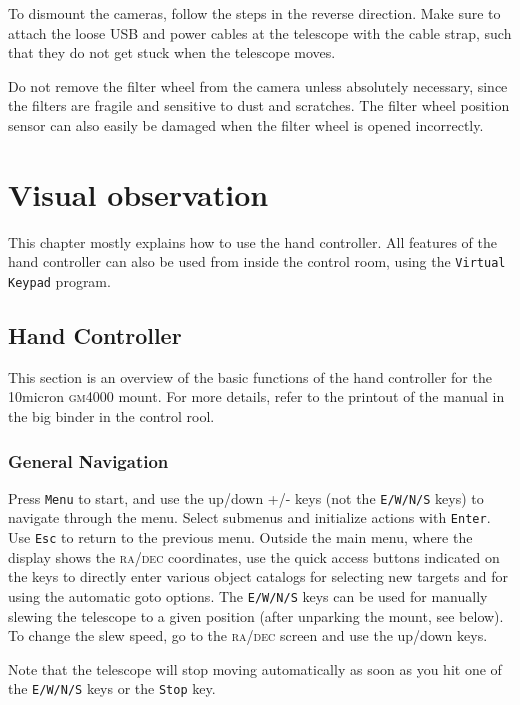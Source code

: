 \documentclass[a4paper, 11pt, fleqn]{memoir}
\begin{document}
To dismount the cameras, follow the steps in the reverse direction.
Make sure to attach the loose USB and power cables at the telescope with the cable strap, such that they do not get stuck when the telescope moves.

Do not remove the filter wheel from the camera unless absolutely necessary, since the filters are fragile and sensitive to dust and scratches.
The filter wheel position sensor can also easily be damaged when the filter wheel is opened incorrectly.

\chapter{Visual observation}

This chapter mostly explains how to use the hand controller.
All features of the hand controller can also be used from inside the control room, using the \texttt{Virtual Keypad} program.

\section{Hand Controller}

This section is an overview of the basic functions of the hand controller for the 10micron \textsc{gm4000} mount.
For more details, refer to the printout of the manual in the big binder in the control rool.

\subsection{General Navigation}

Press \texttt{Menu} to start, and use the up/down +/- keys (not the \texttt{E/W/N/S} keys) to navigate through the menu.
Select submenus and initialize actions with \texttt{Enter}.
Use \texttt{Esc} to return to the previous menu.
Outside the main menu, where the display shows the \textsc{ra/dec} coordinates, use the quick access buttons indicated on the keys to directly enter various object catalogs for selecting new targets and for using the automatic goto options.
The \texttt{E/W/N/S} keys can be used for manually slewing the telescope to a given position (after unparking the mount, see below).
To change the slew speed, go to the \textsc{ra/dec} screen and use the up/down keys.

Note that the telescope will stop moving automatically as soon as you hit one of the \texttt{E/W/N/S} keys or the \texttt{Stop} key.
\end{document}
